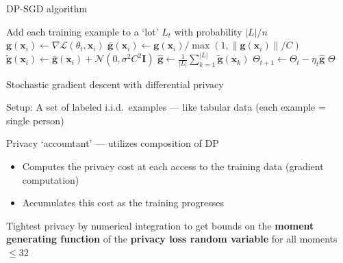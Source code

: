 \documentclass[12pt,aspectratio=169,handout]{beamer}
\begin{document}
\begin{frame}{DP-SGD algorithm}
	
\begin{minipage}[t][10cm][t]{15cm}

\begin{algorithmic}[1]
\State Add each training example to a `lot' $L_t$ with probability $|L|/n$
\State $\bm{g}(\bm{x}_i) \gets \nabla \mathcal{L} (\theta_t, \bm{x}_i)$
\State
$\bar{\bm{g}}(\bm{x}_i) \gets \bm{g}(\bm{x}_i) / \max \left(1 , \|  \bm{g}(\bm{x}_i) \| / C \right)
$
\State $\tilde{\bm{g}}(\bm{x}_i) \gets \bar{\bm{g}}(\bm{x}_i) + \mathcal{N}(0, \sigma^2 C^2 \bm{I})$
\EndFor
\State $\hat{\bm{g}} \gets \frac{1}{|L|} \sum_{k = 1}^{|L|} \tilde{\bm{g}}(\bm{x}_k)$
\State $\Theta_{t + 1} \gets \Theta_t - \eta_t \hat{\bm{g}}$
\EndFor
\State \Return $\Theta$
\EndFunction
\end{algorithmic}

\end{minipage}
	
\end{frame}



\begin{frame}{Stochastic gradient descent with differential privacy}

Setup: A set of labeled i.i.d.\ examples --- like tabular data (each example = single person)

Privacy `accountant' --- utilizes composition of DP
\begin{itemize}
	\item Computes the privacy cost at each access to the training data (gradient computation)
	\item Accumulates this cost as the training progresses
\end{itemize}

Tightest privacy by numerical integration to get bounds on the \textbf{moment generating function} of the \textbf{privacy loss random variable} for all moments $\leq 32$


\end{frame}
\end{document}
